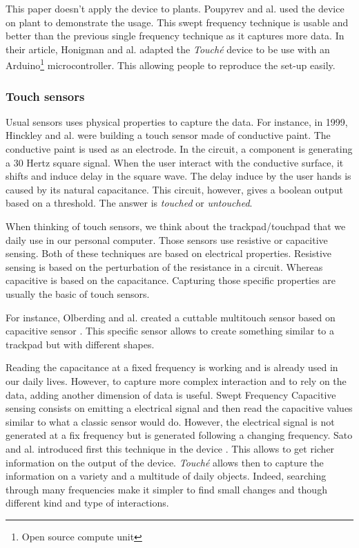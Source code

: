 This paper doesn't apply the device to plants. Poupyrev and al. \cite{poupyrevBotanicusInteracticusInteractive2012}
used the device on plant to demonstrate the usage. This swept frequency technique is usable and better
than the previous single frequency technique as it captures more data.
In their article, Honigman and al. \cite{honigmanTechniquesSweptFrequencyb} adapted the \textit{Touché}
device to be use with an Arduino\footnote{Open source compute unit} microcontroller. This allowing people
to reproduce the set-up easily.



\subsubsection{Touch sensors}

Usual sensors uses physical properties to capture the data. For instance, in 1999, Hinckley and al. \cite{hinckleyTouchsensingInputDevices1999}
were building a touch sensor made of conductive paint. The conductive paint is used as an electrode.
In the circuit, a component is generating a 30 Hertz square signal. When the user interact with the conductive surface,
it shifts and induce delay in the square wave. The delay induce by the user hands is caused by its natural
capacitance. This circuit, however, gives a boolean output based on a threshold. The answer is \textit{touched}
or \textit{untouched}. %

When thinking of touch sensors, we think about the trackpad/touchpad that we daily use in our personal
computer. Those sensors use resistive or capacitive sensing. Both of these techniques are based on electrical
properties. Resistive sensing is based on the perturbation of the resistance in a circuit. Whereas
capacitive is based on the capacitance. Capturing those specific properties are usually the basic of
touch sensors.

For instance, Olberding and al. created a cuttable multitouch sensor based on capacitive sensor \cite{olberdingCuttableMultitouchSensor2013}.
This specific sensor allows to create something similar to a trackpad but with different shapes.

Reading the capacitance at a fixed frequency is working and is already used in our daily lives.
However, to capture more complex interaction and to rely on the data, adding another dimension of data is useful.
Swept Frequency Capacitive sensing consists on emitting a electrical signal and then read the capacitive values
similar to what a classic sensor would do. However, the electrical signal is not generated at a fix frequency
but is generated following a changing frequency.
Sato and al. introduced first this technique in the  device \cite{satoToucheEnhancingTouch2012}.
This allows to get richer information on the output of the device. \textit{Touché} allows then to capture
the information on a variety and a multitude of daily objects.
Indeed, searching through many frequencies make it simpler to find small changes and though different kind and type
of interactions.

